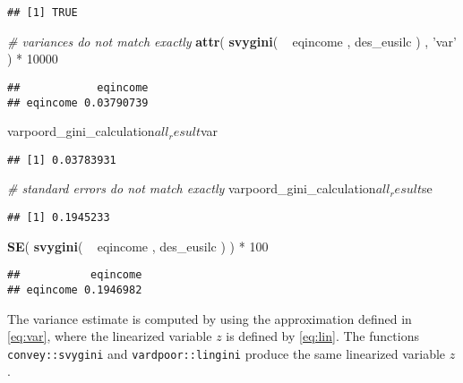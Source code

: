 \documentclass[]{book}
\newenvironment{Shaded}{\begin{snugshade}}{\end{snugshade}}
\newcommand{\KeywordTok}[1]{\textcolor[rgb]{0.13,0.29,0.53}{\textbf{{#1}}}}
\newcommand{\DecValTok}[1]{\textcolor[rgb]{0.00,0.00,0.81}{{#1}}}
\newcommand{\StringTok}[1]{\textcolor[rgb]{0.31,0.60,0.02}{{#1}}}
\newcommand{\CommentTok}[1]{\textcolor[rgb]{0.56,0.35,0.01}{\textit{{#1}}}}
\newcommand{\NormalTok}[1]{{#1}}
\theoremstyle{definition}
\theoremstyle{definition}
\theoremstyle{remark}
\begin{document}
\begin{verbatim}
## [1] TRUE
\end{verbatim}

\begin{Shaded}
\begin{Highlighting}[]
\CommentTok{# variances do not match exactly}
\KeywordTok{attr}\NormalTok{( }\KeywordTok{svygini}\NormalTok{( ~}\StringTok{ }\NormalTok{eqincome , des_eusilc ) , }\StringTok{'var'} \NormalTok{) *}\StringTok{ }\DecValTok{10000}
\end{Highlighting}
\end{Shaded}

\begin{verbatim}
##            eqincome
## eqincome 0.03790739
\end{verbatim}

\begin{Shaded}
\begin{Highlighting}[]
\NormalTok{varpoord_gini_calculation$all_result$var}
\end{Highlighting}
\end{Shaded}

\begin{verbatim}
## [1] 0.03783931
\end{verbatim}

\begin{Shaded}
\begin{Highlighting}[]
\CommentTok{# standard errors do not match exactly}
\NormalTok{varpoord_gini_calculation$all_result$se}
\end{Highlighting}
\end{Shaded}

\begin{verbatim}
## [1] 0.1945233
\end{verbatim}

\begin{Shaded}
\begin{Highlighting}[]
\KeywordTok{SE}\NormalTok{( }\KeywordTok{svygini}\NormalTok{( ~}\StringTok{ }\NormalTok{eqincome , des_eusilc ) ) *}\StringTok{ }\DecValTok{100}
\end{Highlighting}
\end{Shaded}

\begin{verbatim}
##           eqincome
## eqincome 0.1946982
\end{verbatim}

The variance estimate is computed by using the approximation defined in
\eqref{eq:var}, where the linearized variable \(z\) is defined by
\eqref{eq:lin}. The functions \texttt{convey::svygini} and
\texttt{vardpoor::lingini} produce the same linearized variable \(z\).
\end{document}
